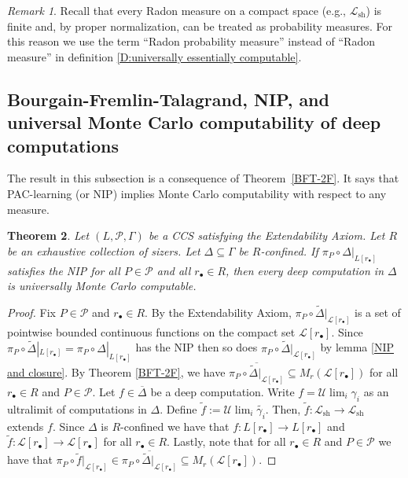 \documentclass[psamsfonts]{amsart}
\newtheorem{thm}{Theorem}[section]
\theoremstyle{definition}
\theoremstyle{remark}
\newtheorem{rem}[thm]{Remark}
\numberwithin{equation}{section}
\begin{document}
\begin{rem}
    Recall that every Radon measure on a compact space (e.g., $\mathcal{L}_{\text{sh}}$) is finite and, by proper normalization, can be treated as probability measures. 
    For this reason we use the term ``Radon probability measure'' instead of ``Radon measure'' in definition \ref{D:universally essentially computable}.
\end{rem}


\subsection{Bourgain-Fremlin-Talagrand, NIP, and universal Monte Carlo computability of  deep computations}

The result in this subsection is a consequence of Theorem~\ref{BFT-2F}. 
It says that PAC-learning (or NIP) implies Monte Carlo computability with respect to any measure.

\begin{thm}\label{T:NIP and Monte Carlo}
    Let $(L,\mathcal{P},\Gamma)$ be a CCS satisfying the Extendability Axiom.
Let $R$ be an exhaustive collection of sizers.
Let $\Delta\subseteq\Gamma$ be $R$-confined.
If $\pi_P\circ\Delta|_{L[r_\bullet]}$ satisfies the NIP for all $P\in\mathcal{P}$ and all $r_{\bullet}\in R$, then every deep computation in $\Delta$ is universally Monte Carlo computable.
\end{thm}

\begin{proof}
    Fix $P\in\mathcal{P}$ and $r_\bullet\in R$. 
    By the Extendability Axiom, $\pi_P\circ\tilde\Delta|_{\mathcal{L}[r_\bullet]}$ is a set of pointwise bounded continuous functions on the compact set $\mathcal{L}[r_\bullet]$.
    Since $\pi_P\circ\tilde\Delta|_{L[r_\bullet]}=\pi_P\circ\Delta|_{L[r_\bullet]}$ has the NIP then so does $\pi_P\circ\tilde\Delta|_{\mathcal{L}[r_\bullet]}$ by lemma \ref{NIP and closure}.
    By Theorem \ref{BFT-2F}, we have $\overline{\pi_P\circ\tilde\Delta|_{\mathcal{L}[r_\bullet]}}\subseteq M_r(\mathcal{L}[r_\bullet])$ for all $r_\bullet\in R$ and $P\in\mathcal{P}$.
    Let $f\in\overline{\Delta}$ be a deep computation.
    Write $f=\mathcal{U}\lim_i\gamma_i$ as an ultralimit of computations in $\Delta$.
    Define $\tilde{f}:=\mathcal{U}\lim_i\tilde{\gamma_i}$.
    Then, $\tilde{f}:\mathcal{L}_{\text{sh}}\rightarrow \mathcal{L}_{\text{sh}}$ extends $f$.
    Since $\Delta$ is $R$-confined we have that $f:L[r_\bullet]\rightarrow L[r_\bullet]$ and $\tilde{f}:\mathcal{L}[r_\bullet]\rightarrow \mathcal{L}[r_\bullet]$ for all $r_\bullet\in R$.
    Lastly, note that for all $r_\bullet\in R$ and $P\in\mathcal{P}$ we have that $\pi_P \circ \tilde{f}|_{\mathcal{L}[r_\bullet]}\in \overline{\pi_P\circ\tilde\Delta|_{\mathcal{L}[r_\bullet]}}\subseteq M_r(\mathcal{L}[r_\bullet])$.
\end{proof}
\end{document}
